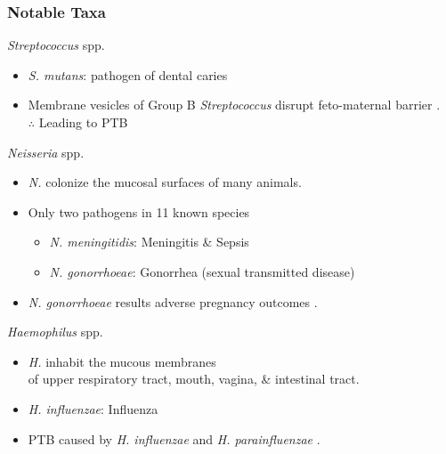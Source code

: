 \documentclass{beamer}
\begin{document}
    \begin{frame}[allowframebreaks]
        \frametitle{Notable Taxa}

        \begin{block}{\textit{Streptococcus} spp.}
            \begin{itemize}
                \item \textit{S. mutans}: pathogen of dental caries
                \item Membrane vesicles of Group B \textit{Streptococcus} disrupt feto-maternal barrier \cite{streptococcus-1}. \\
                    $\therefore$ Leading to PTB
            \end{itemize}
        \end{block}

        \begin{block}{\textit{Neisseria} spp.}
            \begin{itemize}
                \item \textit{N.} colonize the mucosal surfaces of many animals.
                \item Only two pathogens in 11 known species
                    \begin{itemize}
                        \item \textit{N. meningitidis}: Meningitis \& Sepsis
                        \item \textit{N. gonorrhoeae}: Gonorrhea (sexual transmitted disease)
                    \end{itemize}
                \item \textit{N. gonorrhoeae} results adverse pregnancy outcomes \cite{neisseria-1}.
            \end{itemize}
        \end{block}

        \begin{block}{\textit{Haemophilus} spp.}
            \begin{itemize}
                \item \textit{H.} inhabit the mucous membranes \\
                    of upper respiratory tract, mouth, vagina, \& intestinal tract.
                \item \textit{H. influenzae}: Influenza
                \item PTB caused by \textit{H. influenzae} \cite{haemophilus-1} and \textit{H. parainfluenzae} \cite{haemophilus-2}.
            \end{itemize}
        \end{block}


\end{frame}
\end{document}
